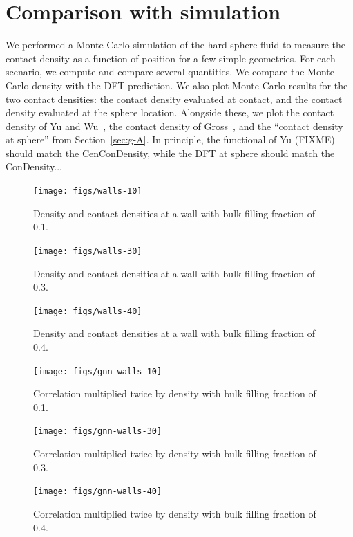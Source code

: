 \documentclass[letterpaper,twocolumn,amsmath,amssymb,jcp,10pt,aip]{revtex4-1}
\begin{document}
\section{Comparison with simulation}

We performed a Monte-Carlo simulation of the hard sphere fluid to
measure the contact density as a function of position for a few simple
geometries.  For each scenario, we compute and compare several
quantities.  We compare the Monte Carlo density with the DFT
prediction.  We also plot Monte Carlo results for the two contact
densities: the contact density evaluated at contact, and the contact
density evaluated at the sphere location.  Alongside these, we plot
the contact density of Yu and
Wu~\cite{yu2002fmt-dft-inhomogeneous-associating}, the contact density
of Gross~\cite{gross2009density}, and the ``contact density at
sphere'' from Section~\ref{sec:g-A}.  In principle, the
functional of Yu (FIXME) should match the CenConDensity, while the DFT
at sphere should match the ConDensity...

\begin{figure}
  \texttt{[image: figs/walls-10]}
  \caption{Density and contact densities at a wall with bulk filling
    fraction of 0.1.}
  \label{fig:walls-10}
\end{figure}

\begin{figure}
  \texttt{[image: figs/walls-30]}
  \caption{Density and contact densities at a wall with bulk filling
    fraction of 0.3.}
  \label{fig:walls-30}
\end{figure}

\begin{figure}
  \texttt{[image: figs/walls-40]}
  \caption{Density and contact densities at a wall with bulk filling
    fraction of 0.4.}
  \label{fig:walls-40}
\end{figure}

\begin{figure}
  \texttt{[image: figs/gnn-walls-10]}
  \caption{Correlation multiplied twice by density with bulk filling
    fraction of 0.1.}
  \label{fig:gnn-walls-10}
\end{figure}

\begin{figure}
  \texttt{[image: figs/gnn-walls-30]}
  \caption{Correlation multiplied twice by density with bulk filling
    fraction of 0.3.}
  \label{fig:gnn-walls-30}
\end{figure}

\begin{figure}
  \texttt{[image: figs/gnn-walls-40]}
  \caption{Correlation multiplied twice by density with bulk filling
    fraction of 0.4.}
  \label{fig:gnn-walls-10}
\end{figure}
\end{document}

